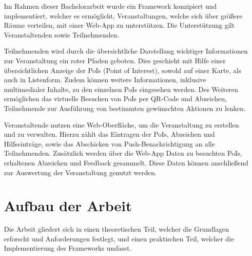 Im Rahmen dieser Bachelorarbeit wurde ein Framework konzipiert und
implementiert, welcher es ermöglicht, Veranstaltungen, welche sich über größere
Räume verteilen, mit einer Web-App zu unterstützen. Die Unterstützung gilt
Veranstaltenden sowie Teilnehmenden.

Teilnehmenden wird durch die übersichtliche Darstellung wichtiger Informationen
zur Veranstaltung ein roter Pfaden geboten. Dies geschieht mit Hilfe einer
übersichtlichen Anzeige der PoIs (Point of Interest), sowohl auf einer Karte,
als auch in Listenform. Zudem können weitere Informationen, inklusive
multimedialer Inhalte, zu den einzelnen PoIs eingesehen werden. Des Weiteren
ermöglichen das virtuelle Besuchen von PoIs per QR-Code und Abzeichen,
Teilnehmende zur Ausführung von bestimmten gewünschten Aktionen zu lenken.

Veranstaltende nutzen eine Web-Oberfläche, um die Veranstaltung zu erstellen und
zu verwalten. Hierzu zählt das Eintragen der PoIs, Abzeichen und Hilfseinträge,
sowie das Abschicken von Push-Benachrichtigung an alle Teilnehmenden. Zusätzlich
werden über die Web-App Daten zu besuchten PoIs, erhaltenen Abzeichen und
Feedback gesammelt. Diese Daten können anschließend zur Auswertung der
Veranstaltung genutzt werden.

\section{Aufbau der Arbeit}

Die Arbeit gliedert sich in einen theoretischen Teil, welcher die Grundlagen
erforscht und Anforderungen festlegt, und einen praktischen Teil, welcher die
Implementierung des Frameworks umfasst.









